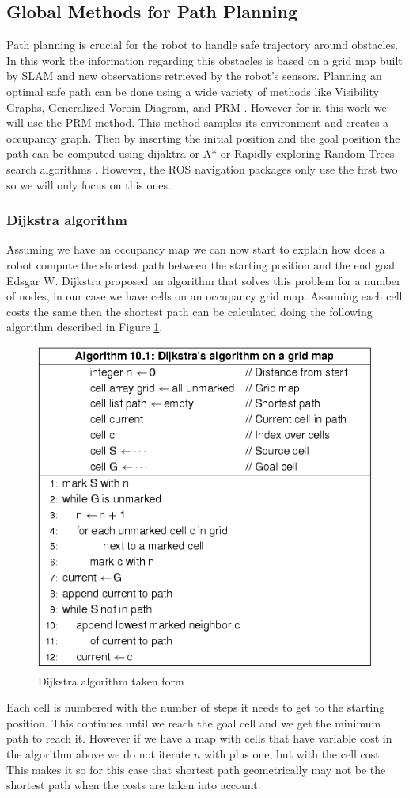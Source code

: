 \subsection{Global Methods for Path Planning}
Path planning is crucial for the robot to handle safe trajectory around obstacles. In this work the information regarding this obstacles is based on a grid map built by \ac{SLAM} and new observations retrieved by the robot's sensors.  Planning an optimal safe path can be done using a wide variety of methods like Visibility Graphs, Generalized Voroin Diagram, and \ac{PRM} \cite{globalmethods}. However for in this work we will use the \ac{PRM} method. This method samples its environment and creates a occupancy graph. Then by inserting the initial position and the goal position the path can be computed using dijaktra or A* or Rapidly exploring Random Trees search algorithms . However, the \ac{ROS} navigation packages only use the first two so  we will only focus on this ones.


\subsubsection{Dijkstra algorithm}\label{djk}
Assuming we have an occupancy map we can now start to explain how does a robot compute the shortest path between the starting position and the end goal. Edsgar W. Dijkstra proposed an algorithm that solves this problem for a number of nodes, in our case we have cells on an occupancy grid map. Assuming each cell costs the same then the shortest path can be calculated doing the following algorithm described in Figure \ref{fig:dalg}. 
\begin{figure}[ht!] 
\centerline{\includegraphics [width=0.7 \textwidth]{imgs/chapter5/Dalg.png}}
\caption[Dijkstra algorithm]{Dijkstra algorithm taken form \cite{Ben-Ari2018}}
\label{fig:dalg}
\end{figure}
Each cell is numbered with the number of steps it needs to get to the starting position. This continues until we reach the goal cell and we get the minimum path to reach it. However if we have a map with cells that have variable cost in the algorithm above we do not iterate $n$ with plus one, but with the cell cost. This makes it so for this case that  shortest path geometrically may not be the shortest path when the costs are taken into account.

